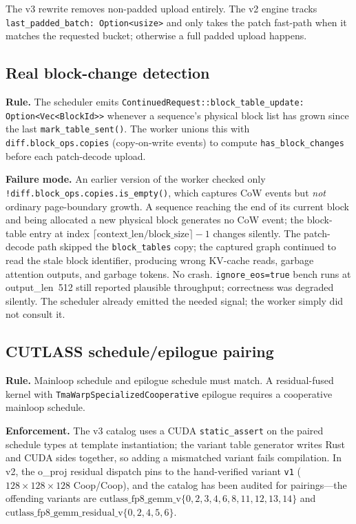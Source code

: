 The v3 rewrite removes non-padded upload entirely. The v2 engine
tracks \texttt{last\_padded\_batch: Option<usize>} and only takes the
patch fast-path when it matches the requested bucket; otherwise a
full padded upload happens.

\subsection{Real block-change detection}

\textbf{Rule.} The scheduler emits
\texttt{ContinuedRequest::block\_table\_update:} \texttt{Option<Vec<BlockId>>}
whenever a sequence's physical block list has grown since the last
\texttt{mark\_table\_sent()}. The worker unions this with
\texttt{diff.block\_ops.copies} (copy-on-write events) to compute
\texttt{has\_block\_changes} before each patch-decode upload.

\textbf{Failure mode.} An earlier version of the worker checked only
\texttt{!diff.block\_ops.copies.is\_empty()}, which captures CoW
events but \emph{not} ordinary page-boundary growth. A sequence
reaching the end of its current block and being allocated a new
physical block generates no CoW event; the block-table entry at index
$\lceil \text{context\_len} / \text{block\_size} \rceil - 1$ changes
silently. The patch-decode path skipped the \texttt{block\_tables}
copy; the captured graph continued to read the stale block identifier,
producing wrong KV-cache reads, garbage attention outputs, and
garbage tokens. No crash. \texttt{ignore\_eos=true} bench runs at
output\_len~512 still reported plausible throughput; correctness was
degraded silently. The scheduler already emitted the needed signal;
the worker simply did not consult it.

\subsection{CUTLASS schedule/epilogue pairing}

\textbf{Rule.} Mainloop schedule and epilogue schedule must match. A
residual-fused kernel with \texttt{TmaWarpSpecializedCooperative}
epilogue requires a cooperative mainloop schedule.

\textbf{Enforcement.} The v3 catalog uses a CUDA
\texttt{static\_assert} on the paired schedule types at template
instantiation; the variant table generator writes Rust and CUDA sides
together, so adding a mismatched variant fails compilation. In v2, the
o\_proj residual dispatch pins to the hand-verified variant \texttt{v1}
($128\!\times\!128\!\times\!128$ Coop/Coop), and the catalog has been
audited for pairings---the offending variants are
$\text{cutlass\_fp8\_gemm\_v}\{0,2,3,4,6,8,11,12,13,14\}$ and
$\text{cutlass\_fp8\_gemm\_residual\_v}\{0,2,4,5,6\}$.

